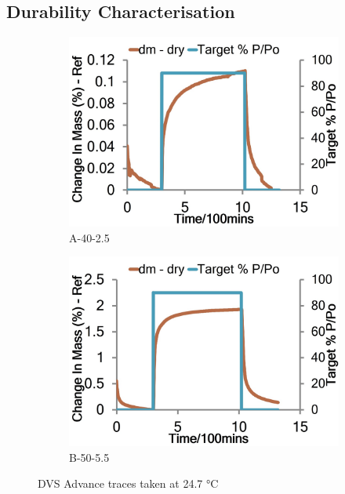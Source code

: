 \subsection{Durability Characterisation}
\begin{figure}[H]
\centering
\begin{subfigure}{.22\textwidth}
  \includegraphics[width=1\linewidth]{Sections/Figures/DVSA.jpg}
  \caption{A-40-2.5}
  \label{fig:sub1}
\end{subfigure}
\begin{subfigure}{.22\textwidth}
  \includegraphics[width=1\linewidth]{Sections/Figures/DVSB.jpg}
  \caption{B-50-5.5}
  \label{fig:sub2}
\end{subfigure}
\caption{DVS Advance traces taken at 24.7 °C}
\label{fig:test}
\end{figure}

